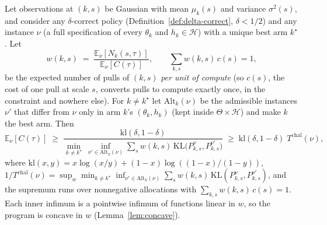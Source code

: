 \begin{theorem}
\label{thm:lower-bound}
Let observations at $(k,s)$ be Gaussian with mean $\mu_k(s)$ and variance $\sigma^2(s)$,
and consider any $\delta$-correct policy (Definition~\ref{def:delta-correct},
$\delta < 1/2$) and any instance $\nu$ (a full specification of every $\theta_k$ and
$h_k \in \mathcal{H}$) with a unique best arm $k^\star$. Let
\[
  w(k,s) \;=\; \frac{\mathbb{E}_\nu[N_k(s,\tau)]}{\mathbb{E}_\nu[C(\tau)]},
  \qquad \sum_{k,s} w(k,s)\, c(s) = 1,
\]
be the expected number of pulls of $(k,s)$ \emph{per unit of compute} (so $c(s)$, the
cost of one pull at scale $s$, converts pulls to compute exactly once, in the constraint
and nowhere else). For $k \ne k^\star$ let $\mathrm{Alt}_k(\nu)$ be the admissible
instances $\nu'$ that differ from $\nu$ only in arm $k$'s $(\theta_k, h_k)$ (kept inside
$\Theta \times \mathcal{H}$) and make $k$ the best arm. Then
\[
  \mathbb{E}_\nu[C(\tau)] \;\ge\; \frac{\mathrm{kl}(\delta, 1-\delta)}
  {\displaystyle \min_{k \ne k^\star}\ \inf_{\nu' \in \mathrm{Alt}_k(\nu)}
  \sum_{s} w(k,s)\, \mathrm{KL}\big(P^{\nu}_{k,s}, P^{\nu'}_{k,s}\big)}
  \;\ge\; \mathrm{kl}(\delta, 1-\delta)\; T^{\mathrm{chal}}(\nu),
\]
where $\mathrm{kl}(x,y) = x\log(x/y) + (1-x)\log((1-x)/(1-y))$,
$1/T^{\mathrm{chal}}(\nu) = \sup_{w} \min_{k\ne k^\star} \inf_{\nu'\in\mathrm{Alt}_k(\nu)}
\sum_s w(k,s)\,\mathrm{KL}(P^\nu_{k,s}, P^{\nu'}_{k,s})$, and the supremum runs over
nonnegative allocations with $\sum_{k,s} w(k,s)\,c(s)=1$. Each inner infimum is a
pointwise infimum of functions linear in $w$, so the program is concave in $w$
(Lemma~\ref{lem:concave}).


\end{theorem}
